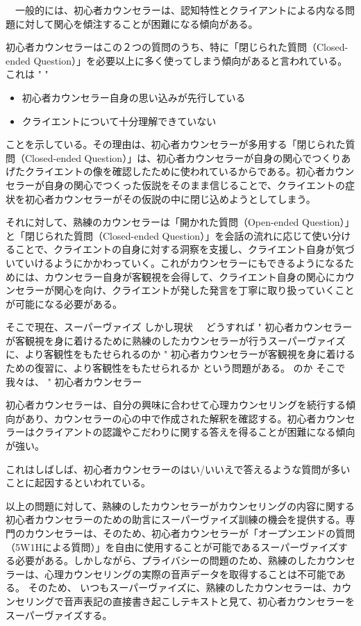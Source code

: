 \documentclass[shuuron]{kuee}
\begin{document}
　一般的には、初心者カウンセラーは、認知特性とクライアントによる内なる問題に対して関心を傾注することが困難になる傾向がある。

初心者カウンセラーはこの２つの質問のうち、特に「閉じられた質問（Closed-ended Question）」を必要以上に多く使ってしまう傾向があると言われている。これは
"
"
\begin{itemize}
\item 初心者カウンセラー自身の思い込みが先行している
\item クライエントについて十分理解できていない
\end{itemize}
ことを示している。その理由は、初心者カウンセラーが多用する「閉じられた質問（Closed-ended Question）」は、初心者カウンセラーが自身の関心でつくりあげたクライエントの像を確認したために使われているからである。初心者カウンセラーが自身の関心でつくった仮説をそのまま信じることで、クライエントの症状を初心者カウンセラーがその仮説の中に閉じ込めようとしてしまう。

それに対して、熟練のカウンセラーは「開かれた質問（Open-ended Question）」と「閉じられた質問（Closed-ended Question）」を会話の流れに応じて使い分けることで、クライエントの自身に対する洞察を支援し、クライエント自身が気づいていけるようにかかわっていく。これがカウンセラーにもできるようになるためには、カウンセラー自身が客観視を会得して、クライエント自身の関心にカウンセラーが関心を向け、クライエントが発した発言を丁寧に取り扱っていくことが可能になる必要がある。

そこで現在、スーパーヴァイズ
しかし現状　
どうすれば
"	初心者カウンセラーが客観視を身に着けるために熟練のしたカウンセラーが行うスーパーヴァイズに、より客観性をもたせられるのか
"	初心者カウンセラーが客観視を身に着けるための復習に、より客観性をもたせられるか
という問題がある。
のか
そこで我々は、
"	初心者カウンセラー


  初心者カウンセラーは、自分の興味に合わせて心理カウンセリングを続行する傾向があり、カウンセラーの心の中で作成された解釈を確認する。初心者カウンセラーはクライアントの認識やこだわりに関する答えを得ることが困難になる傾向が強い。

これはしばしば、初心者カウンセラーのはい/いいえで答えるような質問が多いことに起因するといわれている。

 以上の問題に対して、熟練のしたカウンセラーがカウンセリングの内容に関する初心者カウンセラーのための助言にスーパーヴァイズ訓練の機会を提供する。専門のカウンセラーは、そのため、初心者カウンセラーが「オープンエンドの質問（5W1Hによる質問）」を自由に使用することが可能であるスーパーヴァイズする必要がある。しかしながら、プライバシーの問題のため、熟練のしたカウンセラーは、心理カウンセリングの実際の音声データを取得することは不可能である。 そのため、 いつもスーパーヴァイズに、熟練のしたカウンセラーは、カウンセリングで音声表記の直接書き起こしテキストと見て、初心者カウンセラーをスーパーヴァイズする。
\end{document}

